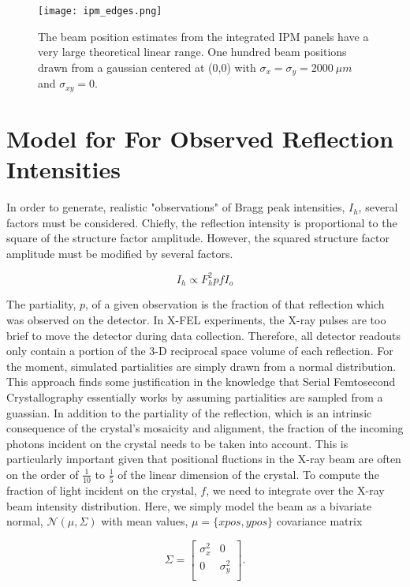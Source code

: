 \documentclass{report}
\begin{document}
\begin{figure} 
\centering
\texttt{[image: ipm\_edges.png]}
\caption{The beam position estimates from the integrated IPM panels have a very large theoretical linear range. One hundred beam positions drawn from a gaussian centered at (0,0) with $\sigma_x=\sigma_y=2000\ \mu m$ and $\sigma_{xy}=0$.}
\label{fig:ipm_linearity}
\end{figure}

\section{Model for For Observed Reflection Intensities}
In order to generate, realistic "observations" of Bragg peak intensities, $I_h$, several factors must be considered. 
Chiefly, the reflection intensity is proportional to the square of the structure factor amplitude. 
However, the squared structure factor amplitude must be modified by several factors. 

\begin{equation}
I_h \propto F_h^2pfI_o
\end{equation}

The partiality, $p$, of a given observation is the fraction of that reflection which was observed on the detector. 
In X-FEL experiments, the X-ray pulses are too brief to move the detector during data collection. 
Therefore, all detector readouts only contain a portion of the 3-D reciprocal space volume of each reflection. 
For the moment, simulated partialities are simply drawn from a normal distribution. 
This approach finds some justification in the knowledge that Serial Femtosecond Crystallography essentially works by assuming partialities are sampled from a guassian. 
In addition to the partiality of the reflection, which is an intrinsic consequence of the crystal's mosaicity and alignment, the fraction of the incoming photons incident on the crystal needs to be taken into account. 
This is particularly important given that positional fluctions in the X-ray beam are often on the order of $\frac {1} {10}$ to $\frac {1} {5}$ of the linear dimension of the crystal. 
To compute the fraction of light incident on the crystal, $f$, we need to integrate over the X-ray beam intensity distribution. 
Here, we simply model the beam as a bivariate normal, $\mathcal{N}(\mu, \Sigma)$ with mean values, $\mu=\{xpos, ypos\}$ covariance matrix

\begin{equation}
\Sigma = 
\begin{bmatrix}
    \sigma_x^2 & 0 \\
    0 & \sigma_y^2 \\
\end{bmatrix}.
\end{equation}
\end{document}
